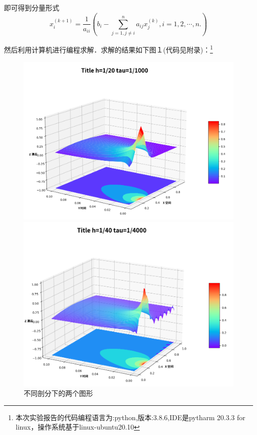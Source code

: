 \documentclass[UTF8]{ctexart}
\begin{document}
即可得到分量形式
\begin{equation}
x^{(k+1)}_i = \frac{1}{a_{ii}}\left(b_i-\sum^{n}_{j=1,j\neq i}a_{ij}x^{(k)}_j ,i=1,2,\cdots,n. \right)
\end{equation}

然后利用计算机进行编程求解．求解的结果如下图１(代码见附录)：\footnote{本次实验报告的代码编程语言为:python,版本:3.8.6,IDE是pytharm 20.3.3 for linux，操作系统基于linux-ubuntu20.10}

\newpage

\begin{figure}
    \centering
    \begin{minipage}{8.5cm}
         \includegraphics[scale= 0.22]{2.png}
    \end{minipage}
    \begin{minipage}{8.5cm}
         \includegraphics[scale= 0.22]{3.png}
    \end{minipage}
    
    \caption{不同剖分下的两个图形}
\end{figure}
\end{document}
